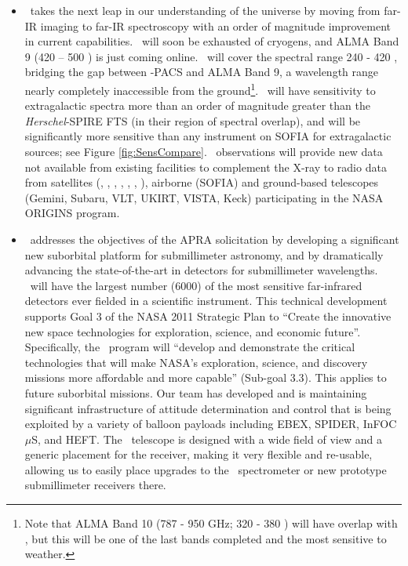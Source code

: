 \begin{itemize}
\parskip-11pt

\item
\name\ takes the next leap in our understanding of the universe by
moving from far-IR imaging to far-IR spectroscopy with an order of
magnitude improvement in current capabilities.  \herschel\ will soon
be exhausted of cryogens, and ALMA Band 9 (420 -- 500 \mum) is just
coming online.  \name\ will cover the spectral range 240 \mum - 420
\mum, bridging the gap between \herschel-PACS and ALMA Band 9, a
wavelength range nearly completely inaccessible from the
ground\footnote{Note that ALMA Band 10 (787 - 950 GHz; 320 - 380 \mum)
will have overlap with \name, but this will be one of the last bands
completed and the most sensitive to weather.}.  \name\ will have
sensitivity to extragalactic spectra more than an order of magnitude
greater than the {\em Herschel}-SPIRE FTS (in their region of spectral
overlap), and will be significantly more sensitive than any instrument
on SOFIA for extragalactic sources; see Figure \ref{fig:SensCompare}.  \name\ observations will
provide new data not available from existing facilities to complement
the X-ray to radio data from satellites (\chandra, \xmm, \hst,
\spitzer, \herschel, \planck, \akari), airborne (SOFIA) and
ground-based telescopes (Gemini, Subaru, VLT, UKIRT, VISTA, Keck)
participating in the NASA ORIGINS program.
\parskip-5pt
\item
\name\ addresses the objectives of the APRA solicitation by
developing a significant new suborbital platform for submillimeter
astronomy, and by dramatically advancing the state-of-the-art in
detectors for submillimeter wavelengths.  \name\ will have the
largest number (6000) of the most sensitive far-infrared 
detectors ever fielded in a scientific instrument.  This technical
development
supports Goal 3 of the NASA 2011 Strategic Plan to ``Create the
innovative new space technologies for exploration, science, and
economic future''.  Specifically, the \name\ program will ``develop
and demonstrate the critical technologies that will make NASA's
exploration, science, and discovery missions more affordable and more
capable'' (Sub-goal 3.3).  This applies to future suborbital missions.
Our team has developed and is maintaining significant infrastructure
of attitude determination and control that is being exploited by a
variety of balloon payloads including EBEX, SPIDER, InFOC$\mu$S, and
HEFT.  The \name\ telescope is designed with a wide field of view
and a generic placement for the receiver, making it very
flexible and re-usable, allowing us to easily place
upgrades to the \name\ spectrometer or new prototype submillimeter
receivers there.


\end{itemize}
